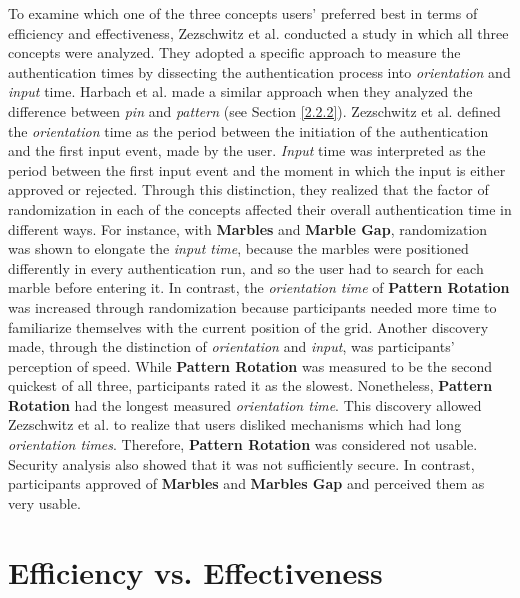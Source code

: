 To examine which one of the three concepts users' preferred best in terms of efficiency and effectiveness, Zezschwitz et al. \cite{Marbles} conducted a study in which all three concepts were analyzed. They adopted a specific approach to measure the authentication times by dissecting the authentication process into \textit{orientation} and \textit{input} time. Harbach et al. \cite{AnatomySmartphone} made a similar approach when they analyzed the difference between \textit{pin} and \textit{pattern} (see Section \ref{2.2.2}). Zezschwitz et al. \cite{Marbles} defined the \textit{orientation} time as the period between the initiation of the authentication and the first input event, made by the user. \textit{Input} time was interpreted as the period between the first input event and the moment in which the input is either approved or rejected. Through this distinction, they realized that the factor of randomization in each of the concepts affected their overall authentication time in different ways. For instance, with \textbf{Marbles} and \textbf{Marble Gap}, randomization was shown to elongate the \textit{input time}, because the marbles were positioned differently in every authentication run, and so the user had to search for each marble before entering it. In contrast, the \textit{orientation time} of \textbf{Pattern Rotation} was increased through randomization because participants needed more time to familiarize themselves with the current position of the grid. Another discovery made, through the distinction of \textit{orientation} and \textit{input}, was participants' perception of speed. While \textbf{Pattern Rotation} was measured to be the second quickest of all three, participants rated it as the slowest. Nonetheless, \textbf{Pattern Rotation} had the longest measured \textit{orientation time}. This discovery allowed Zezschwitz et al. \cite{Marbles} to realize that users disliked mechanisms which had long \textit{orientation times}. Therefore, \textbf{Pattern Rotation} was considered not usable. Security analysis also showed that it was not sufficiently secure. In contrast, participants approved of \textbf{Marbles} and \textbf{Marbles Gap} and perceived them as very usable.

\section{Efficiency vs. Effectiveness}

